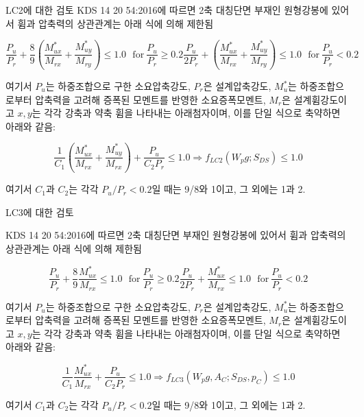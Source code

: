 \documentclass[9pt]{beamer}
\begin{document}
\begin{frame}{LC2에 대한 검토}
KDS 14 20 54:2016에 따르면 2축 대칭단면 부재인 원형강봉에 있어서 휨과 압축력의 상관관계는 아래 식에 의해 제한됨 

\begin{subequations}
	\begin{equation*}
		\frac{P_u}{P_r}+\frac{8}{9}\left(\frac{M_{ux}^*}{M_{rx}}+\frac{M_{uy}^*}{M_{ry}}\right)\leq 1.0 ~~~ \textrm{for}~\frac{P_u}{P_r}\geq 0.2
	\end{equation*}
	\begin{equation*}
		\frac{P_u}{2P_r}+\left(\frac{M_{ux}^*}{M_{rx}}+\frac{M_{uy}^*}{M_{ry}}\right)\leq 1.0 ~~~ \textrm{for}~\frac{P_u}{P_r}< 0.2
	\end{equation*}
\end{subequations}

\noindent 여기서 $P_u$는 하중조합으로 구한 소요압축강도, $P_r$은 설계압축강도, $M_u^*$는 하중조합으로부터 압축력을 고려해 증폭된 모멘트를 반영한 소요증폭모멘트, $M_r$은 설계휨강도이고 $x, y$는 각각 강축과 약축 휨을 나타내는 아래첨자이며, 이를 단일 식으로 축약하면 아래와 같음:

\begin{equation}
	\frac{1}{C_1}\left(\frac{M_{ux}^*}{M_{rx}} + \frac{M_{uy}^*}{M_{rx}}\right) + \frac{P_u}{C_2P_r} \leq 1.0 \Rightarrow f_{LC2}(W_pg;S_{DS}) \leq 1.0
	\label{eq:fLC2}
\end{equation}

\noindent 여기서 $C_1$과 $C_2$는 각각 $P_u/P_r<0.2$일 때는 9/8와 1이고, 그 외에는 1과 2.

\end{frame}
\begin{frame}{LC3에 대한 검토}

KDS 14 20 54:2016에 따르면 2축 대칭단면 부재인 원형강봉에 있어서 휨과 압축력의 상관관계는 아래 식에 의해 제한됨 

\begin{subequations}
	\begin{equation*}
		\frac{P_u}{P_r}+\frac{8}{9}\frac{M_{ux}^*}{M_{rx}}\leq 1.0 ~~~ \textrm{for}~\frac{P_u}{P_r}\geq 0.2
	\end{equation*}
	\begin{equation*}
		\frac{P_u}{2P_r}+\frac{M_{ux}^*}{M_{rx}}\leq 1.0 ~~~ \textrm{for}~\frac{P_u}{P_r}< 0.2
	\end{equation*}
\end{subequations}

\noindent 여기서 $P_u$는 하중조합으로 구한 소요압축강도, $P_r$은 설계압축강도, $M_u^*$는 하중조합으로부터 압축력을 고려해 증폭된 모멘트를 반영한 소요증폭모멘트, $M_r$은 설계휨강도이고 $x, y$는 각각 강축과 약축 휨을 나타내는 아래첨자이며, 이를 단일 식으로 축약하면 아래와 같음:

\begin{equation}
	\frac{1}{C_1}\frac{M_{ux}^*}{M_{rx}} + \frac{P_u}{C_2P_r} \leq 1.0 \Rightarrow f_{LC3}(W_pg, A_C;S_{DS}, p_C) \leq 1.0
	\label{eq:fLC3}
\end{equation}

\noindent 여기서 $C_1$과 $C_2$는 각각 $P_u/P_r<0.2$일 때는 9/8와 1이고, 그 외에는 1과 2.
\end{frame}
\end{document}
